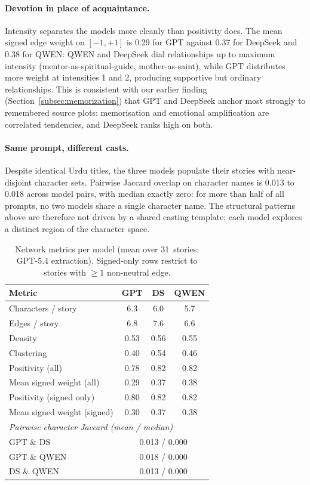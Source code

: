 \documentclass[11pt]{article}
\begin{document}
\paragraph{Devotion in place of acquaintance.}
Intensity separates the models more cleanly than
positivity does. The mean signed edge weight on
$[-1,+1]$ is 0.29 for GPT against 0.37 for DeepSeek and
0.38 for QWEN: QWEN and DeepSeek dial relationships up
to maximum intensity (mentor-as-spiritual-guide,
mother-as-saint), while GPT distributes more weight at
intensities 1 and 2, producing supportive but ordinary
relationships. This is consistent with our earlier
finding (Section~\ref{subsec:memorization}) that GPT and
DeepSeek anchor most strongly to remembered source plots:
memorisation and emotional amplification are correlated
tendencies, and DeepSeek ranks high on both.

\paragraph{Same prompt, different casts.}
Despite identical Urdu titles, the three models populate
their stories with near-disjoint character sets. Pairwise
Jaccard overlap on character names is 0.013 to 0.018
across model pairs, with median exactly zero: for more
than half of all prompts, no two models share a single
character name. The structural patterns above are
therefore not driven by a shared casting template; each
model explores a distinct region of the character space.

\begin{table}[h]
\centering\small
\caption{Network metrics per model (mean over 31~stories;
GPT-5.4 extraction). Signed-only rows restrict to
stories with $\geq 1$ non-neutral edge.}
\label{tab:network_metrics}
\begin{tabular}{lccc}
\hline
\textbf{Metric} & \textbf{GPT} & \textbf{DS} & \textbf{QWEN} \\
\hline
Characters / story          & 6.3  & 6.0  & 5.7  \\
Edges / story               & 6.8  & 7.6  & 6.6  \\
Density                     & 0.53 & 0.56 & 0.55 \\
Clustering                  & 0.40 & 0.54 & 0.46 \\
Positivity (all)            & 0.78 & 0.82 & 0.82 \\
Mean signed weight (all)    & 0.29 & 0.37 & 0.38 \\
Positivity (signed only)    & 0.80 & 0.82 & 0.82 \\
Mean signed weight (signed) & 0.30 & 0.37 & 0.38 \\
\hline
\multicolumn{4}{l}{\textit{Pairwise character Jaccard (mean / median)}} \\
GPT \& DS                   & \multicolumn{3}{c}{0.013 / 0.000} \\
GPT \& QWEN                 & \multicolumn{3}{c}{0.018 / 0.000} \\
DS \& QWEN                  & \multicolumn{3}{c}{0.013 / 0.000} \\
\hline
\end{tabular}
\end{table}
\end{document}
